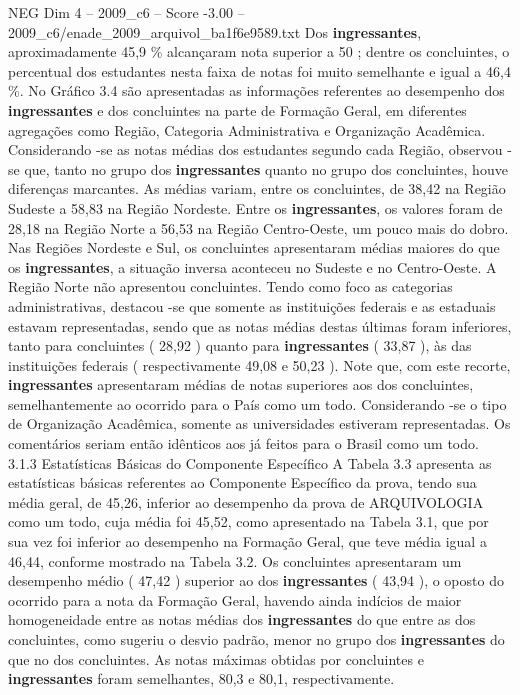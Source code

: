 \begin{textsample}{NEG Dim 4 – 2009\_c6 – Score -3.00 – 2009\_c6/enade\_2009\_arquivol\_ba1f6e9589.txt}
Dos \textbf{ingressantes}, aproximadamente 45,9 \% alcançaram nota superior a 50 ; dentre os concluintes, o percentual dos estudantes nesta faixa de notas foi muito semelhante e igual a 46,4 \%.
No Gráfico 3.4 são apresentadas as informações referentes ao desempenho dos \textbf{ingressantes} e dos concluintes na parte de Formação Geral, em diferentes agregações como Região, Categoria Administrativa e Organização Acadêmica.
Considerando -se as notas médias dos estudantes segundo cada Região, observou -se que, tanto no grupo dos \textbf{ingressantes} quanto no grupo dos concluintes, houve diferenças marcantes.
As médias variam, entre os concluintes, de 38,42 na Região Sudeste a 58,83 na Região Nordeste.
Entre os \textbf{ingressantes}, os valores foram de 28,18 na Região Norte a 56,53 na Região Centro-Oeste, um pouco mais do dobro.
Nas Regiões Nordeste e Sul, os concluintes apresentaram médias maiores do que os \textbf{ingressantes}, a situação inversa aconteceu no Sudeste e no Centro-Oeste.
A Região Norte não apresentou concluintes.
Tendo como foco as categorias administrativas, destacou -se que somente as instituições federais e as estaduais estavam representadas, sendo que as notas médias destas últimas foram inferiores, tanto para concluintes ( 28,92 ) quanto para \textbf{ingressantes} ( 33,87 ), às das instituições federais ( respectivamente 49,08 e 50,23 ).
Note que, com este recorte, \textbf{ingressantes} apresentaram médias de notas superiores aos dos concluintes, semelhantemente ao ocorrido para o País como um todo.
Considerando -se o tipo de Organização Acadêmica, somente as universidades estiveram representadas.
Os comentários seriam então idênticos aos já feitos para o Brasil como um todo. 3.1.3 Estatísticas Básicas do Componente Específico A Tabela 3.3 apresenta as estatísticas básicas referentes ao Componente Específico da prova, tendo sua média geral, de 45,26, inferior ao desempenho da prova de ARQUIVOLOGIA como um todo, cuja média foi 45,52, como apresentado na Tabela 3.1, que por sua vez foi inferior ao desempenho na Formação Geral, que teve média igual a 46,44, conforme mostrado na Tabela 3.2.
Os concluintes apresentaram um desempenho médio ( 47,42 ) superior ao dos \textbf{ingressantes} ( 43,94 ), o oposto do ocorrido para a nota da Formação Geral, havendo ainda indícios de maior homogeneidade entre as notas médias dos \textbf{ingressantes} do que entre as dos concluintes, como sugeriu o desvio padrão, menor no grupo dos \textbf{ingressantes} do que no dos concluintes.
As notas máximas obtidas por concluintes e \textbf{ingressantes} foram semelhantes, 80,3 e 80,1, respectivamente.

\end{textsample}
